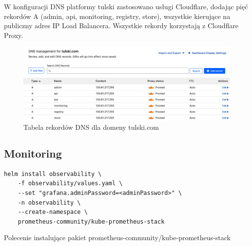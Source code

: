 W konfiguracji DNS platformy tulski zastosowano usługi Cloudflare, dodając pięć rekordów A (admin, api, monitoring, registry, store), wszystkie kierujące na publiczny adres IP Load Balancera.
Wszystkie rekordy korzystają z Cloudflare Proxy.

\begin{figure}[H]
    \centering
    \includegraphics[width=\textwidth]{img/dns-tulski-com}
    \caption{Tabela rekordów DNS dla domeny tulski.com}
    \label{fig:dns-tulski-com}
\end{figure}

\subsection{Monitoring}\label{subsec:monitoring}


\begin{listing}[H]
    \begin{verbatim}
helm install observability \
    -f observability/values.yaml \
    --set "grafana.adminPassword=<adminPassword>" \
    -n observability \
    --create-namespace \
    prometheus-community/kube-prometheus-stack
    \end{verbatim}
    \caption{Polecenie instalujące pakiet prometheus-community/kube-prometheus-stack}
    \label{lst:helm-install-observability}
\end{listing}

%

